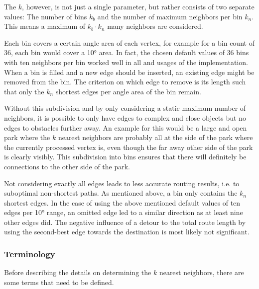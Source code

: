 				The $k$, however, is not just a single parameter, but rather consists of two separate values:
				The number of bins $k_b$ and the number of maximum neighbors per bin $k_n$.
				This means a maximum of $k_b \cdot k_n$ many neighbors are considered.
				
				Each bin covers a certain angle area of each vertex, for example for a bin count of 36, each bin would cover a 10° area.
				In fact, the chosen default values of 36 bins with ten neighbors per bin worked well in all and usages of the implementation.
				When a bin is filled and a new edge should be inserted, an existing edge might be removed from the bin.
				The criterion on which edge to remove is its length such that only the $k_n$ shortest edges per angle area of the bin remain.
				
				Without this subdivision and by only considering a static maximum number of neighbors, it is possible to only have edges to complex and close objects but no edges to obstacles further away.
				An example for this would be a large and open park where the $k$ nearest neighbors are probably all at the side of the park where the currently processed vertex is, even though the far away other side of the park is clearly visibly.
				This subdivision into bins ensures that there will definitely be connections to the other side of the park.
				
				Not considering exactly all edges leads to less accurate routing results, i.e. to suboptimal non-shortest paths.
				As mentioned above, a bin only contains the $k_n$ shortest edges.
				In the case of using the above mentioned default values of ten edges per 10° range, an omitted edge led to a similar direction as at least nine other edges did.
				The negative influence of a detour to the total route length by using the second-best edge towards the destination is most likely not significant.
			
			\subsubsection{Terminology}
			
				Before describing the details on determining the $k$ nearest neighbors, there are some terms that need to be defined.
				

